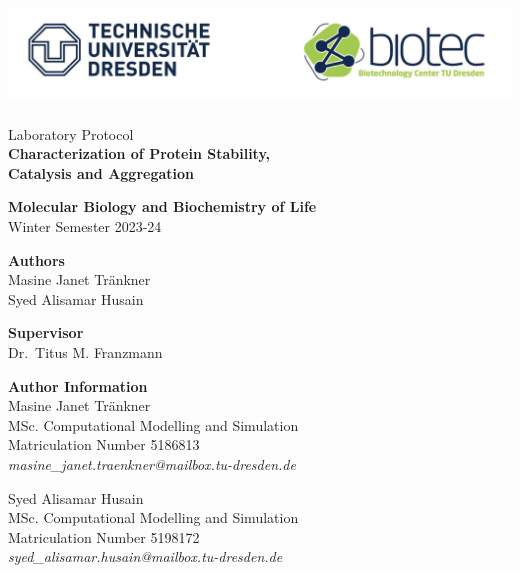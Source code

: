 \documentclass[a4paper,11pt]{article}
\begin{document}
    \begin{titlepage}
        \begin{center}
            \includegraphics[height=7.5em]{../resources/unilogo.png}
            \vspace{6em}

            {\LARGE Laboratory Protocol} \\ 
            {\huge\bfseries Characterization of Protein Stability,\\ Catalysis and Aggregation}
            \vspace{3em}
            
            {\large\bfseries Molecular Biology and Biochemistry of Life}\\
            Winter Semester 2023-24
            \vspace{12em}

            {\bfseries Authors} \\ 
            Masine Janet Tränkner\\
            Syed Alisamar Husain
            \vspace{5em}

            {\bfseries Supervisor} \\ Dr.\ Titus M. Franzmann
        \end{center}
        
    \end{titlepage}
    \pagebreak

    \tableofcontents
    \listoffigures
    \vspace{3em}
    {\noindent\Large\bfseries Author Information \vspace{0.75em}}\\
    \noindent\large Masine Janet Tränkner\\
    {\small MSc. Computational Modelling and Simulation}\\
    {\small Matriculation Number 5186813}\\
    {\it\small masine\_janet.traenkner@mailbox.tu-dresden.de}\\\vspace{0.5em}
    
    \noindent\large Syed Alisamar Husain\\
    {\small MSc. Computational Modelling and Simulation}\\
    {\small Matriculation Number 5198172}\\
    {\it\small syed\_alisamar.husain@mailbox.tu-dresden.de}
    \pagebreak
\end{document}
